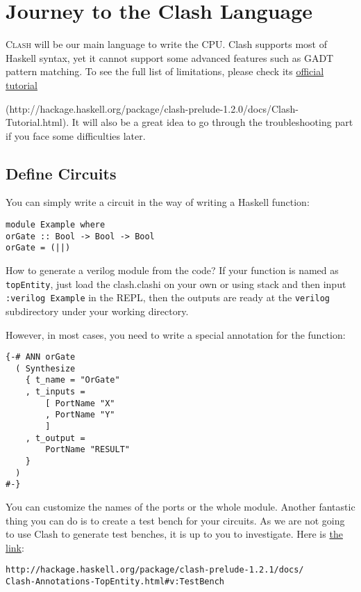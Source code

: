 \chapter{Journey to the Clash Language}
\lettrine{C}{lash} will be our main language to write the CPU. Clash supports most of Haskell syntax, yet it cannot support some advanced features such as GADT pattern matching. To see the full list of limitations, please check its \href{http://hackage.haskell.org/package/clash-prelude-1.2.0/docs/Clash-Tutorial.html}{official tutorial}

(http://hackage.haskell.org/package/clash-prelude-1.2.0/docs/Clash-Tutorial.html). It will also be a great idea to go through the troubleshooting part if you face some difficulties later.

\section{Define Circuits}
You can simply write a circuit in the way of writing a Haskell function:
\begin{verbatim}
module Example where
orGate :: Bool -> Bool -> Bool
orGate = (||)
\end{verbatim}
How to generate a verilog module from the code? If your function is named as \texttt{topEntity}, just load the clash.clashi on your own or using stack and then input \texttt{:verilog Example} in the REPL, then the outputs are ready at the \texttt{verilog} subdirectory under your working directory. 

However, in most cases, you need to write a special annotation for the function:
\begin{verbatim}
{-# ANN orGate
  ( Synthesize
    { t_name = "OrGate"
    , t_inputs = 
        [ PortName "X"
        , PortName "Y"
        ]
    , t_output = 
        PortName "RESULT" 
    }
  )
#-}
\end{verbatim}
You can customize the names of the ports or the whole module. Another fantastic thing you can do is to create a test bench for your circuits. As we are not going to use Clash to generate test benches, it is up to you to investigate. Here is \href{http://hackage.haskell.org/package/clash-prelude-1.2.1/docs/Clash-Annotations-TopEntity.html#v:TestBench}{the link}:

\begin{verbatim}
http://hackage.haskell.org/package/clash-prelude-1.2.1/docs/
Clash-Annotations-TopEntity.html#v:TestBench
\end{verbatim}

